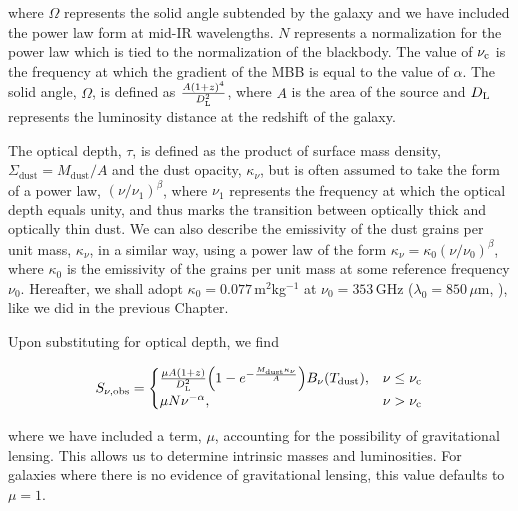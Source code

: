 \noindent where $\Omega$ represents the solid angle subtended by the galaxy and we have included the power law form at mid-IR wavelengths. $N$ represents a normalization for the power law which is tied to the normalization of the blackbody. The value of $\nu_{\rm c}$ is the frequency at which the gradient of the MBB is equal to the value of $\alpha$. The solid angle, $\Omega$, is defined as $\frac{A(1+z)^4}{D_{\rm L}^2}$, where $A$ is the area of the source and $D_{\rm L}$ represents the luminosity distance at the redshift of the galaxy. 

The optical depth, $\tau$, is defined as the product of surface mass density, $\Sigma_{\textrm{dust}} = M_{\textrm{dust}}/A$ and the dust opacity, $\kappa_\nu$, but is often assumed to take the form of a power law, $(\nu/\nu_1)^\beta$, where $\nu_1$ represents the frequency at which the optical depth equals unity, and thus marks the transition between optically thick and optically thin dust. We can also describe the emissivity of the dust grains per unit mass, $\kappa_\nu$, in a similar way, using a power law of the form $\kappa_\nu = \kappa_0(\nu/\nu_0)^\beta$, where $\kappa_0$ is the emissivity of the grains per unit mass at some reference frequency $\nu_0$. Hereafter, we shall adopt $\kappa_0 = 0.077\,$m$^2$kg$^{-1}$ at $\nu_0 = 353\,$GHz ($\lambda_0 = 850\,\mu$m, \citealt{Dunne_2000, James_2002}), like we did in the previous Chapter.

Upon substituting for optical depth, we find 

\begin{equation}
	S_{\nu, \textrm{obs}} =  
	\begin{cases}
		\frac{\mu A (1+z)}{D_{\rm L}^2} \Big(1- e^{-\frac{M_{\textrm{dust}}\kappa_\nu}{A}}\Big) B_\nu(T_{\textrm{dust}}), & \nu \le \nu_{\rm c} \\
		\mu N \nu^{-\alpha}, & \nu > \nu_{\rm c} \\
	\end{cases}
\end{equation}

\noindent where we have included a term, $\mu$, accounting for the possibility of gravitational lensing. This allows us to determine intrinsic masses and luminosities. For galaxies where there is no evidence of gravitational lensing, this value defaults to $\mu = 1$.

